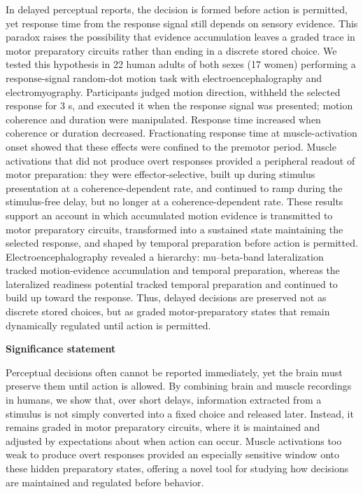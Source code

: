 \documentclass[a4paper,11pt]{article}
\theoremstyle{definition}
\newcommand{\1}{\mathbbm{1}}
\begin{document}
In delayed perceptual reports, the decision is formed before action is permitted, yet response time from the response signal still depends on sensory evidence. This paradox raises the possibility that evidence accumulation leaves a graded trace in motor preparatory circuits rather than ending in a discrete stored choice. We tested this hypothesis in 22 human adults of both sexes (17 women) performing a response-signal random-dot motion task with electroencephalography and electromyography. Participants judged motion direction, withheld the selected response for 3 s, and executed it when the response signal was presented; motion coherence and duration were manipulated. Response time increased when coherence or duration decreased. Fractionating response time at muscle-activation onset showed that these effects were confined to the premotor period. Muscle activations that did not produce overt responses provided a peripheral readout of motor preparation: they were effector-selective, built up during stimulus presentation at a coherence-dependent rate, and continued to ramp during the stimulus-free delay, but no longer at a coherence-dependent rate. These results support an account in which accumulated motion evidence is transmitted to motor preparatory circuits, transformed into a sustained state maintaining the selected response, and shaped by temporal preparation before action is permitted. Electroencephalography revealed a hierarchy: mu--beta-band lateralization tracked motion-evidence accumulation and temporal preparation, whereas the lateralized readiness potential tracked temporal preparation and continued to build up toward the response. Thus, delayed decisions are preserved not as discrete stored choices, but as graded motor-preparatory states that remain dynamically regulated until action is permitted.

\textbf{Significance statement}

Perceptual decisions often cannot be reported immediately, yet the brain must preserve them until action is allowed. By combining brain and muscle recordings in humans, we show that, over short delays, information extracted from a stimulus is not simply converted into a fixed choice and released later. Instead, it remains graded in motor preparatory circuits, where it is maintained and adjusted by expectations about when action can occur. Muscle activations too weak to produce overt responses provided an especially sensitive window onto these hidden preparatory states, offering a novel tool for studying how decisions are maintained and regulated before behavior.
\end{document}
